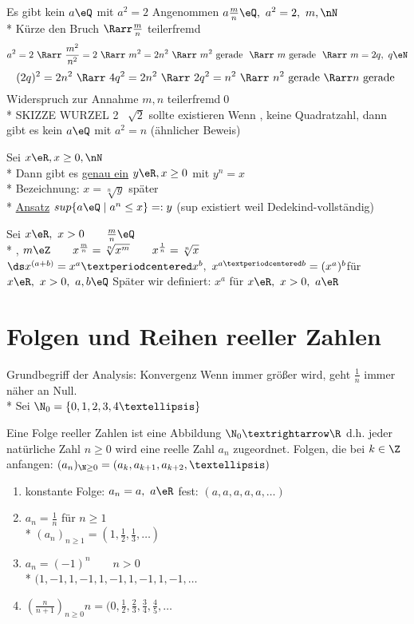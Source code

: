 Es gibt kein $a\eQ$ mit $a^2=2$
\bew
Angenommen $a\frac{m}{n}\eQ,\ a^2=2,\ m,\nN$\\*
Kürze den Bruch $\Rarr \frac{m}{n}$ teilerfremd
$$a^2=2\ \Rarr\ \frac{m^2}{n^2}=2 \ \Rarr\ m^2=2n^2 \ \Rarr\ m^2 \text{ gerade } \ \Rarr\ m \text{ gerade } \ \Rarr\ m=2q,\ q\eN$$
$$(2q)^2=2n^2 \ \Rarr\ 4q^2=2n^2 \ \Rarr\ 2q^2=n^2 \ \Rarr\  n^2 \text{ gerade } \Rarr n \text{ gerade }$$
Widerspruch zur Annahme $m,n$ teilerfremd\qed\\*
SKIZZE WURZEL 2 \Rarr\ $\sqrt{2}$ sollte existieren %
\bem
Wenn \nN, keine Quadratzahl, dann gibt es kein $a\eQ$ mit $a^2=n$ (ähnlicher Beweis)

Sei $x\eR, x\geq 0, \nN$\\*
Dann gibt es \ul{genau ein} $y\eR, x\geq 0$ mit $y^n=x$\\*
Bezeichnung: $x=\sqrt[n]{y}$
\bew
später\\*
\ul{Ansatz} $sup\{a\eQ\mid a^n\leq x\}=:y$ (sup existiert weil \R{} Dedekind-vollständig)

Sei $x\eR,\ x>0\qquad \frac{m}{n}\eQ$\\*
\nN, $m\eZ\qquad x^{\frac{m}{n}}=\sqrt[n]{x^m}\qquad x^{\frac{1}{n}}=\sqrt[n]{x}$
$\ds x^{(a+b)}=x^a·x^b,\ x^{a·b}=(x^a)^b$\hfill für $x\eR,\ x>0,\ a,b\eQ$
\bem
Später wir definiert: $x^a$ für $x\eR,\ x>0,\ a\eR$

\chapter{Folgen und Reihen reeller Zahlen}
Grundbegriff der Analysis: Konvergenz
\bsp
Wenn \nN{} immer größer wird, geht $\frac{1}{n}$ immer näher an Null.\\*
Sei $\N_0=\{0,1,2,3,4…\}$

Eine Folge reeller Zahlen ist eine Abbildung $\N_0→\R$ d.h. jeder natürliche Zahl $n\geq 0$ wird eine reelle Zahl $a_n$ zugeordnet.
Folgen, die bei $k\in\Z$ anfangen: $(a_n)_{\N\geq 0}=(a_k,a_{k+1},a_{k+2},…)$
\bsp
\begin{enumerate}
\item{konstante Folge: $a_n=a,\ a\eR$ fest: $(a,a,a,a,a,…)$}
\item{$a_n=\frac{1}{n}$ für $n\geq 1$\\*
$(a_n)_{n\geq 1}=(1,\frac{1}{2},\frac{1}{3},…)$}
\item{$a_n=(-1)^n\qquad n>0$\\*
$(1,-1,1,-1,1,-1,1,-1,1,-1,…$}
\item{$(\frac{n}{n+1})_{n\geq 0}n=(0,\frac{1}{2},\frac{2}{3},\frac{3}{4},\frac{4}{5},…$}
\end{enumerate}

